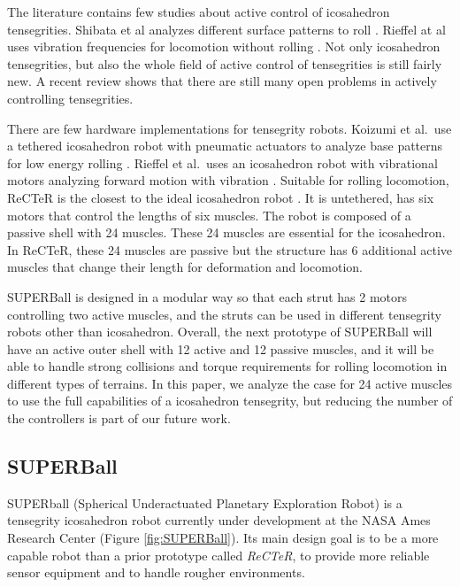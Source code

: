 \documentclass[twocolumn,10pt]{asme2ej}
\begin{document}
The literature contains few studies about active control of icosahedron tensegrities. Shibata et al analyzes different surface patterns to roll \cite{shibata2009crawling,shibata2010moving,koizumi2012rolling}. Rieffel at al uses vibration frequencies for locomotion without rolling \cite{morphological_communication}.
Not only icosahedron tensegrities, but also the whole field of active control of tensegrities is still fairly new. A recent review \cite{Dynamics_Review} shows that there are still many open problems in actively controlling tensegrities.

There are few hardware implementations for tensegrity robots. Koizumi et al.\ use a tethered icosahedron robot with pneumatic actuators to analyze base patterns for low energy rolling \cite{koizumi2012rolling}. Rieffel et al.\ uses an icosahedron robot with vibrational motors analyzing forward motion with vibration \cite{morphological_communication}. Suitable for rolling locomotion, ReCTeR is the closest to the ideal icosahedron robot \cite{2917079}. It is untethered, has six motors that control the lengths of six muscles. The robot is composed of a passive shell with 24 muscles. These 24 muscles are essential for the icosahedron. In ReCTeR, these 24 muscles are passive but the structure has 6 additional active muscles that change their length for deformation and locomotion.

SUPERBall is designed in a modular way so that each strut has 2 motors controlling two active muscles, and the struts can be used in different tensegrity robots other than icosahedron. Overall, the next prototype of SUPERBall will have an active outer shell with 12 active and 12 passive muscles, and it will be able to handle strong collisions and torque requirements for rolling locomotion in different types of terrains. In this paper, we analyze the case for 24 active muscles to use the full capabilities of a icosahedron tensegrity, but reducing the number of the controllers is part of our future work.




\subsection{SUPERBall}
SUPERball (Spherical Underactuated Planetary Exploration Robot) is a tensegrity icosahedron robot currently under development at the NASA Ames Research Center  (Figure \ref{fig:SUPERBall}).
Its main design goal is to be a more capable robot than a prior prototype called \emph{ReCTeR}, to provide more reliable sensor equipment and  to handle rougher environments.
\end{document}
